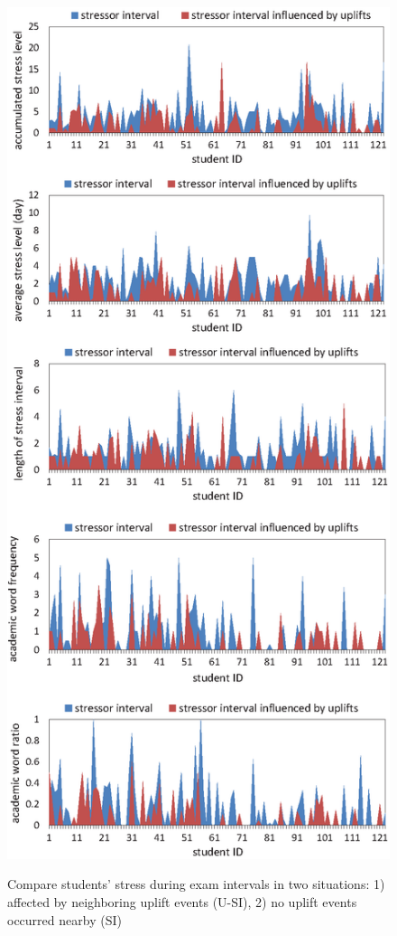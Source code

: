 \begin{figure}
\centering
\caption{Compare students' stress during exam intervals in two situations:
1) affected by neighboring uplift events (U-SI), 2) no uplift events occurred nearby (SI)}
\includegraphics[width=\linewidth]{figs/frequency.eps}
\label{fig:frequency}
\end{figure}

